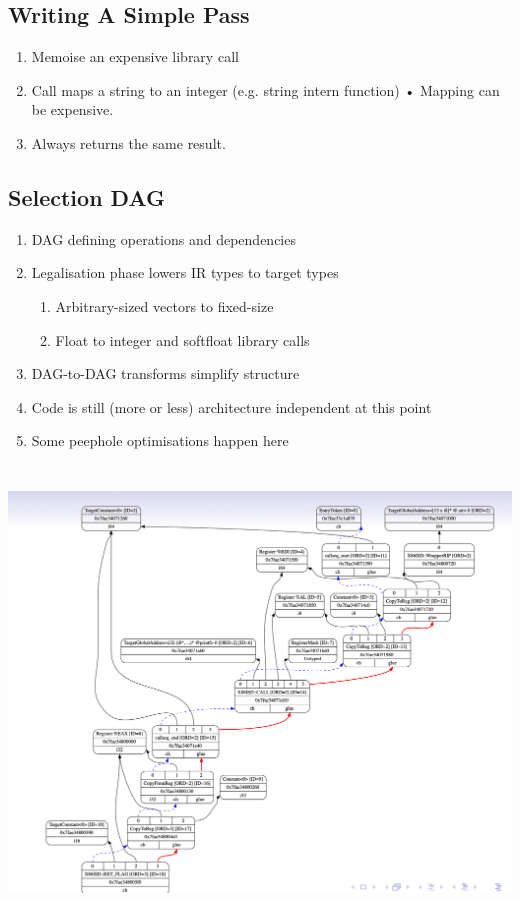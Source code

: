 \documentclass[a4paper]{article}
\theoremstyle{definition}
\begin{document}
\subsection{Writing A Simple Pass}
\begin{enumerate}
  \item Memoise an expensive library call
  \item Call maps a string to an integer (e.g. string intern function) • Mapping can be expensive.
  \item Always returns the same result.
\end{enumerate}

\subsection{Selection DAG}
\begin{enumerate}
  \item DAG defining operations and dependencies
  \item Legalisation phase lowers IR types to target types
  \begin{enumerate}
  \item Arbitrary-sized vectors to fixed-size
  \item Float to integer and softfloat library calls 
  \end{enumerate}
  
  \item DAG-to-DAG transforms simplify structure
  \item Code is still (more or less) architecture independent at this
  point
  \item Some peephole optimisations happen here
\end{enumerate}

\begin{center}
  \includegraphics[height=12cm]{img/Snipaste_2021-04-05_17-45-22.png}
  \end{center}
\end{document}
